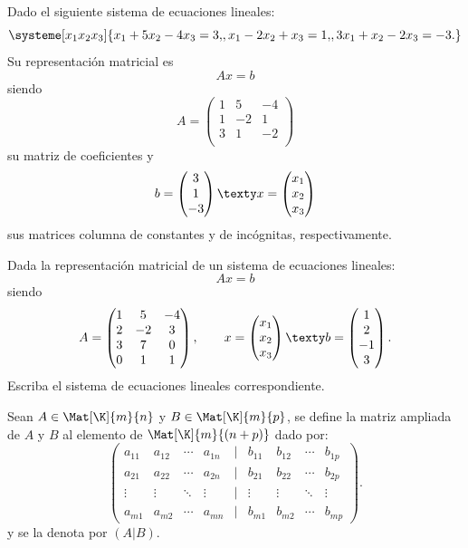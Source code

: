 \documentclass[compacto,10pt]{pubciencias-notas}
\begin{document}
\begin{ejem}\hspace{0pt}\label{Sem2:EjeSisRepMat}
Dado el siguiente sistema de ecuaciones lineales:
  \[
        \systeme[x_1 x_2 x_3]{x_1+5x_2-4x_3=3{,}, x_1-2x_2+x_3=1{,}, 3x_1+x_2-2x_3=-3.}
    \]
Su representación matricial es
\[
    Ax = b
\]
siendo 
 \[
        A=\begin{pmatrix}
        1 & 5 & -4\\
        1& -2 & 1\\
        3&1&-2\\
        \end{pmatrix}
\]
su matriz de coeficientes y 
\[
        b=\begin{pmatrix}
        3\\ 1 \\ -3
        \end{pmatrix}
        \texty
        x=\begin{pmatrix}
        x_1\\ x_2 \\ x_3
        \end{pmatrix}
\]
sus matrices columna de constantes y de incógnitas, respectivamente.
\end{ejem}

\begin{ejer}\hspace{0pt} 
Dada la representación matricial de un sistema de ecuaciones lineales:
\[
    Ax = b
\]
siendo
\[
    A = 
    \begin{pmatrix}
    1 & 5 & -4\\
    2& -2 & 3\\
    3&7&0\\
    0&1&1
    \end{pmatrix},
    \qquad
    x = 
    \begin{pmatrix}
    x_1\\ x_2\\ x_3
    \end{pmatrix}
    \texty
    b =
    \begin{pmatrix}
    1\\ 2 \\ -1\\3
    \end{pmatrix}.
\]
Escriba el sistema de ecuaciones lineales correspondiente.
\end{ejer}

\begin{defi}
    Sean $A\in\Mat[\K]{m}{n}$ y $B\in\Mat[\K]{m}{p}$, se define la matriz ampliada de $A$ y $B$ al elemento de $\Mat[\K]{m}{(n+p)}$ dado por:
    \[
        \begin{pmatrix}
        a_{11}&a_{12}&\cdots&a_{1n}&|&b_{11}&b_{12}&\cdots&b_{1p}\\
        a_{21}&a_{22}&\cdots&a_{2n}&|&b_{21}&b_{22}&\cdots&b_{2p}\\
        \vdots&\vdots&\ddots&\vdots&|&\vdots&\vdots&\ddots&\vdots\\
        a_{m1}&a_{m2}&\cdots&a_{mn}&|&b_{m1}&b_{m2}&\cdots&b_{mp}
        \end{pmatrix}.
    \]
    y se la denota por $(A|B)$.
\end{defi}
\end{document}
